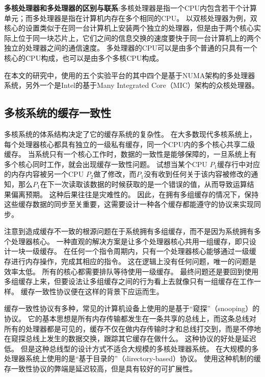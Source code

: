 \textbf{多核处理器和多处理器的区别与联系}:多核处理器是指一个CPU内包含若干个计算单元；而多处理器是指在计算机内存在多个相同的CPU。
以双核处理器为例，双核心的设置类似于在同一台计算机上安装两个独立的处理器，但是由于两个核心实际上位于同一块芯片上，它们之间的信息交换的速度要快于同一台计算机上的两个独立的处理器之间的通信速度。
多处理器的CPU可以是由多个普通的只具有一个核心的CPU构成，也可以是由多个多核CPU构成。

在本文的研究中，使用的五个实验平台的其中四个是基于NUMA架构的多处理器系统，另外一个是Intel的基于Many Integrated Core（MIC）架构的众核处理器。

\subsection{多核系统的缓存一致性}
多核系统的体系结构决定了它的缓存系统的复杂性。
在大多数现代多核系统上，每个处理器核心都具有独立的一级私有缓存，同一个CPU内的多个核心共享二级缓存。
当系统只有一个核心工作时，数据的一致性是能够保障的，一旦系统上有多个核心同时工作，就会出现缓存一致性问题。
试想当某个CPU $P_1$缓存行中对应的内存内容被另一个CPU $P_2$做了修改，而$P_1$没有收到任何关于该内容被修改的通知，那么$P_1$在下一次读取该数据的时候获取的是一个错误的值，从而导致运算结果偏离预期。
这种后果往往是灾难性的。
因此，在拥有多组缓存的情况下，保持这些缓存数据的同步至关重要，这需要设计一种各个缓存都能遵守的协议来实现同步。

注意到造成缓存不一致的根源问题在于系统拥有多组缓存，而不是因为系统拥有多个处理器核心。
一种直观的解决方案是让多个处理器核心共用一组缓存，即只设计一块一级缓存。
在任何一个指令周期内，只有一个处理器核心能够通过一级缓存进行内存操作，完成其相应的指令。
这在逻辑上没有任何问题，唯一的问题是效率太低。
所有的核心都需要排队等待使用一级缓存。
最终问题还是要回到使用多组缓存上来，但要设法让多组缓存之间的行为看上去就像只有一组缓存在工作一样。
缓存一致性协议便在这样的背景下应运而生。

缓存一致性协议有多种，常见的计算机设备上使用的是基于“窥探”（snooping）的协议。
它的基本思想是所有内存传输都发生在一条共享的总线上，而这条总线对所有的处理器都是可见的，缓存不仅在做内存传输时才和总线打交到，而是不停地在窥探总线上发生的数据交换，跟踪其它缓存在做什么。
这种协议的好处是延迟低。
但是这种总线型的设计方式不适合大规模的多核处理器系统。
在大规模的多处理器系统上使用的是“基于目录的”（directory-based）协议。
使用这种机制的缓存一致性协议的弊端是延迟较高，但是具有较好的可扩展性。

